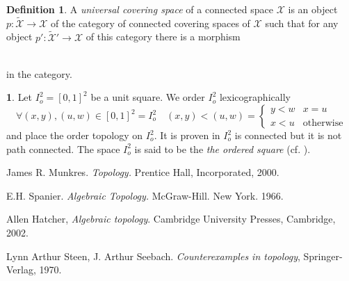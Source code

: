 \documentclass[10]{article}
\theoremstyle{plain}
\theoremstyle{definition}
\newtheorem{empt}[prop]{}%
\theoremstyle{definition}
\newtheorem{definition}[prop]{Definition}
\numberwithin{equation}{section}
\newcommand{\7}{\dagger}                     %
\newcommand{\8}{\bullet}                     %
\renewcommand{\.}{\cdot}                     %
\renewcommand{\:}{\colon}                    %
\newcommand{\sX}{\mathcal{X}}       %
\renewcommand{\:}{\colon}           %
\begin{document}
\begin{appendices}
	\begin{definition}\label{top_universal_covering_defn}\cite{spanier:at}
	A \textit{universal covering space} of a connected space $\sX$ is an object $p: \widetilde{\sX}\to \sX$ of the category of connected covering spaces of $\sX$ such that for any object $p': \widetilde{\sX}'\to \sX$ of this category there is a morphism 
	\newline
	\\
	in the category.
\end{definition}


\begin{empt}\label{top_lex_square_empt}\cite{counter_topology,munkres:topology}
	Let $I^2_o = \left[0,1\right]^2$ be a unit square. We order $I^2_o$ lexicographically
	$$
	\forall (x, y),(u, w) \in \left[0,1\right]^2 = I^2_o \quad (x, y)< (u, w)  = \begin{cases}
		y < w & x = u\\
		x < u & \text{otherwise}
	\end{cases}
	$$
	and place the order topology on $I^2_o$. It is proven in  \cite{counter_topology,munkres:topology} $I^2_o$ is connected but it is not path connected.
	The space $I^2_o$ is said to be the \textit{the ordered square} (cf. \cite{munkres:topology}).
\end{empt}
	
	\end{appendices}	
		
		
		
		\begin{thebibliography}{10}
			
			
 James R. Munkres. {\it Topology.} Prentice Hall, Incorporated, 2000.

E.H. Spanier. {\it Algebraic Topology.} McGraw-Hill. New York. 1966.

Allen Hatcher, \textit{Algebraic topology}. Cambridge University Presses, Cambridge, 2002. 



	Lynn Arthur Steen,
J. Arthur Seebach. \textit{Counterexamples in topology}, Springer-Verlag,
1970.
			
			
			
		\end{thebibliography}
		
		
		
		
	
\end{document}
